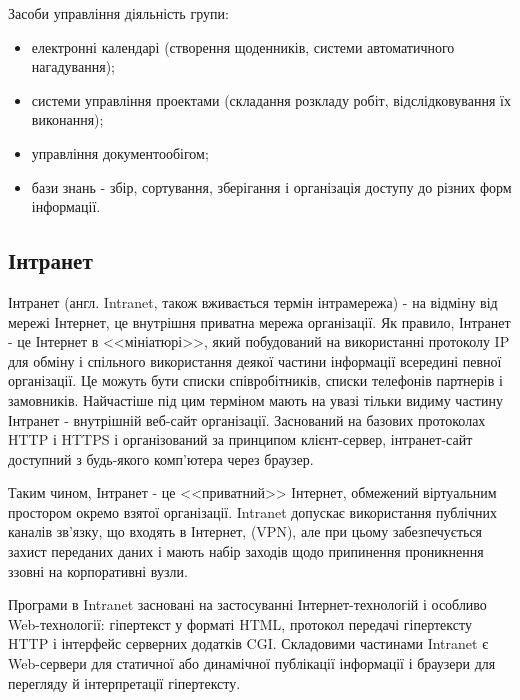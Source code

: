 Засоби управління діяльність групи:
\begin{itemize}
\item електронні календарі (створення щоденників, системи автоматичного нагадування);
\item системи управління проектами (складання розкладу робіт, відслідковування їх виконання);
\item управління документообігом;
\item бази знань - збір, сортування, зберігання і організація доступу до різних форм інформації.
\end{itemize}





\subsection{Інтранет}
Інтранет (англ. Intranet, також вживається термін інтрамережа) - на відміну від мережі Інтернет, це внутрішня приватна мережа організації. 
Як правило, Інтранет - це Інтернет в <<мініатюрі>>, який побудований на використанні протоколу IP для обміну і спільного використання деякої частини інформації всередині певної організації. 
Це можуть бути списки співробітників, списки телефонів партнерів і замовників. 
Найчастіше під цим терміном мають на увазі тільки видиму частину Інтранет - внутрішній веб-сайт організації. 
Заснований на базових протоколах HTTP і HTTPS і організований за принципом клієнт-сервер, інтранет-сайт доступний з будь-якого комп'ютера через браузер. 
\par Таким чином, Інтранет - це <<приватний>> Інтернет, обмежений віртуальним простором окремо взятої організації. 
Intranet допускає використання публічних каналів зв'язку, що входять в Інтернет, (VPN), але при цьому забезпечується захист переданих даних і мають набір заходів щодо припинення проникнення ззовні на корпоративні вузли.
\par Програми в Intranet засновані на застосуванні Інтернет-технологій і особливо Web-технології: гіпертекст у форматі HTML, протокол передачі гіпертексту HTTP і інтерфейс серверних додатків CGI. 
Складовими частинами Intranet є Web-сервери для статичної або динамічної публікації інформації і браузери для перегляду й інтерпретації гіпертексту.


